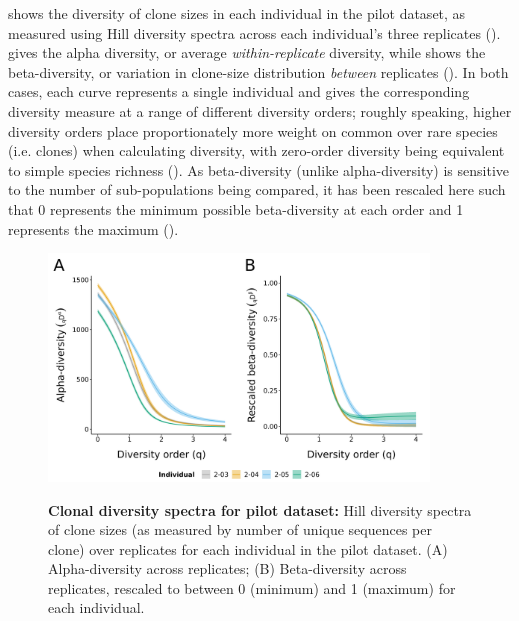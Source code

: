  shows the diversity of clone sizes in each individual in the pilot dataset, as measured using Hill diversity spectra across each individual's three replicates ().  gives the alpha diversity, or average \textit{within-replicate} diversity, while  shows the beta-diversity, or variation in clone-size distribution \textit{between} replicates (). In both cases, each curve represents a single individual and gives the corresponding diversity measure at a range of different diversity orders; roughly speaking, higher diversity orders place proportionately more weight on common over rare species (i.e. clones) when calculating diversity, with zero-order diversity being equivalent to simple species richness (). As beta-diversity (unlike alpha-diversity) is sensitive to the number of sub-populations being compared, it has been rescaled here such that 0 represents the minimum possible beta-diversity at each order and 1 represents the maximum ().

\begin{figure}
\centering
\includegraphics[width = 0.9\textwidth]{_Figures/png/pilot-clone-diversity}
\begin{subfigure}{0em}
\label{fig:igseq-pilot-clone-diversity-alpha}
\end{subfigure}
\begin{subfigure}{0em}
\label{fig:igseq-pilot-clone-diversity-beta}
\end{subfigure}
\caption{\textbf{Clonal diversity spectra for pilot dataset:} Hill diversity spectra of clone sizes (as measured by number of unique sequences per clone) over replicates for each individual in the pilot dataset. (A) Alpha-diversity across replicates; (B) Beta-diversity across replicates, rescaled to between 0 (minimum) and 1 (maximum) for each individual.}
\label{fig:igseq-pilot-clone-diversity}
\end{figure}

